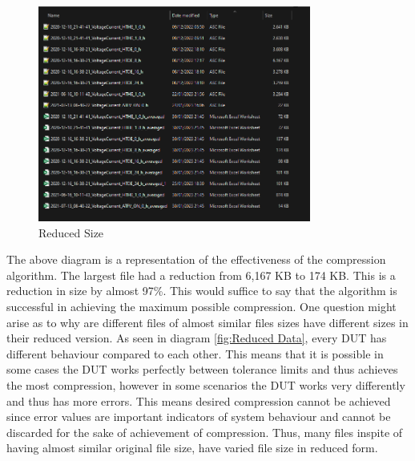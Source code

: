 \begin{figure}[h]
    	\centering
    	\includegraphics[width= 0.8\textwidth]{images/Size Comparison.png}
    	\caption [Comparison of Size]{Reduced Size}  
    	\label{fig:Size Data}
\end{figure}

The above diagram is a representation of the effectiveness of the compression algorithm. The largest file had a reduction from 6,167 KB to 174 KB. This is a reduction in size by almost 97\%. This would suffice to say that the algorithm is successful in achieving the maximum possible compression. One question might arise as to why are different files of almost similar files sizes have different sizes in their reduced version. As seen in diagram \ref{fig:Reduced Data}, every DUT has different behaviour compared to each other. This means that it is possible in some cases the DUT works perfectly between tolerance limits and thus achieves the most compression, however in some scenarios the DUT works very differently and thus has more errors. This means desired compression cannot be achieved since error values are important indicators of system behaviour and cannot be discarded for the sake of achievement of compression. Thus, many files inspite of having almost similar original file size, have varied file size in reduced form. 

